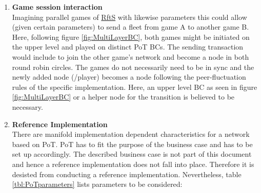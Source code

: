 \begin{enumerate}
	\item \textbf{Game session interaction} \label{sec:GameSessionInteraction} \\
	Imagining parallel games of \hyperref[def:RftS]{RftS} with likewise parameters this could allow (given certain parameters) to send a fleet from game A to another game B.
	Here, following figure \ref{fig:MultiLayerBC}, both games might be initiated on the upper level and played on distinct \gls{PoT} \gls{BC}s.
	The sending transaction would include to join the other game's network and become a node in both round robin circles.
	The games do not necessarily need to be in sync and the newly added node (/player) becomes a node following the peer-fluctuation rules of the specific implementation.
	Here, an upper level \gls{BC} as seen in figure \ref{fig:MultiLayerBC} or a helper node for the transition is believed to be necessary.
		
	\item \textbf{Reference Implementation} \label{sec:Reference Implementation} \\
	There are manifold implementation dependent characteristics for a network based on \gls{PoT}.
	\gls{PoT} has to fit the purpose of the business case and has to be set up accordingly.
	The described business case is not part of this document and hence a reference implementation does not fall into place.
	Therefore it is desisted from conducting a reference implementation.
	Nevertheless, table \ref{tbl:PoTparameters} lists parameters to be considered:
	

\end{enumerate}
